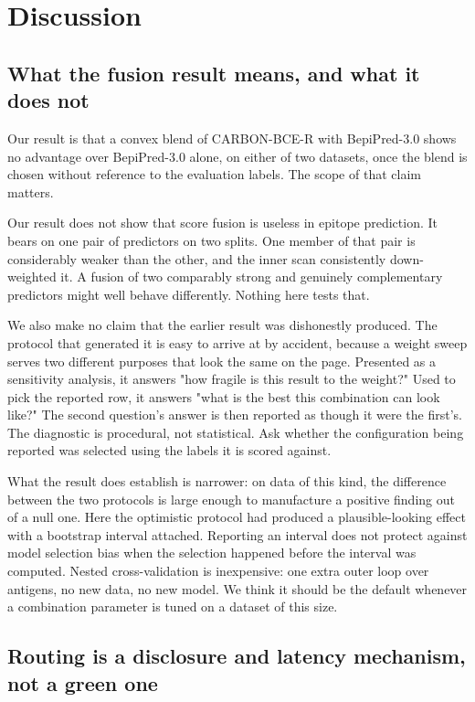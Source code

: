 \section{Discussion}
\label{sec:discussion}

\subsection{What the fusion result means, and what it does not}

Our result is that a convex blend of CARBON-BCE-R with BepiPred-3.0 shows no
advantage over BepiPred-3.0 alone, on either of two datasets, once the blend is
chosen without reference to the evaluation labels. The scope of that claim
matters.

Our result does not show that score fusion is useless in epitope prediction. It
bears on one pair of predictors on two splits. One member of that pair is
considerably weaker than the other, and the inner scan consistently
down-weighted it. A fusion of two comparably strong and genuinely
complementary predictors might well behave differently. Nothing here tests that.

We also make no claim that the earlier result was dishonestly produced. The
protocol that generated it is easy to arrive at by accident, because a weight
sweep serves two different purposes that look the same on the page. Presented as
a sensitivity analysis, it answers "how fragile is this result to the weight?"
Used to pick the reported row, it answers "what is the best this combination can
look like?" The second question's answer is then reported as though it were the
first's. The diagnostic is procedural, not statistical. Ask whether the
configuration being reported was selected using the labels it is scored against.

What the result does establish is narrower: on data of this kind, the
difference between the two protocols is large enough to manufacture a positive
finding out of a null one. Here the optimistic protocol had produced a
plausible-looking effect with a bootstrap interval attached. Reporting an
interval does not protect against model selection bias when the selection
happened before the interval was computed. Nested cross-validation is
inexpensive: one extra outer loop over antigens, no new data, no new
model. We think it should be the
default whenever a combination parameter is tuned on a dataset of this size.

\subsection{Routing is a disclosure and latency mechanism, not a green one}

